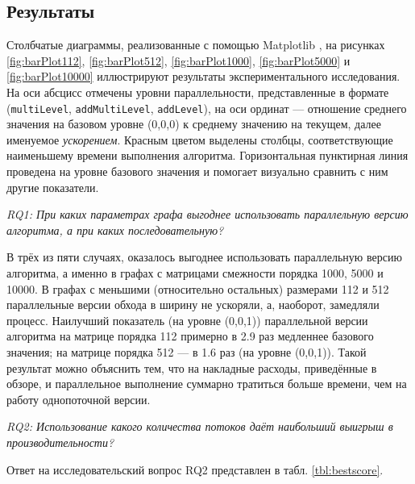 \subsection{Результаты}

Столбчатые диаграммы, реализованные с помощью Mat\-plot\-lib \cite{Hunter:2007}, на рисунках \ref{fig:barPlot112}, \ref{fig:barPlot512}, \ref{fig:barPlot1000}, \ref{fig:barPlot5000} и \ref{fig:barPlot10000} иллюстрируют результаты экспериментального исследования. На оси абсцисс отмечены уровни параллельности, представленные в формате (\texttt{multiLe\-vel}, \texttt{addMultiLevel}, \texttt{addLevel}), на оси ординат --- отношение среднего значения на базовом уровне (0,0,0) к среднему значению на текущем, далее именуемое \textit{ускорением}. Красным цветом выделены столбцы, соответствующие наименьшему времени выполнения алгоритма. Горизонтальная пунктирная линия проведена на уровне базового значения и помогает визуально сравнить с ним другие показатели.

\textit{RQ1: При каких параметрах графа выгоднее использовать параллельную версию алгоритма, а при каких последовательную?}

В трёх из пяти случаях, оказалось выгоднее использовать параллельную версию алгоритма, а именно в графах с матрицами смежности порядка 1000, 5000 и 10000. В графах с меньшими (относительно остальных) размерами 112 и 512 параллельные версии обхода в ширину не ускоряли, а, наоборот, замедляли процесс. Наилучший показатель (на уровне (0,0,1)) параллельной версии алгоритма на матрице порядка 112 примерно в 2.9 раз медленнее базового значения; на матрице порядка 512 --- в 1.6 раз (на уровне (0,0,1)). Такой результат можно объяснить тем, что на накладные расходы, приведённые в обзоре, и параллельное выполнение суммарно тратиться больше времени, чем на работу однопоточной версии.

\textit{RQ2: Использование какого количества потоков даёт наибольший выигрыш в производительности?}

Ответ на исследовательский вопрос RQ2 представлен в табл. \ref{tbl:bestscore}.

\begin{table}
\begin{center}
\caption{Уровни, дающие наибольший выигрыш}
\label{tbl:bestscore}
\end{center}
\end{table}

